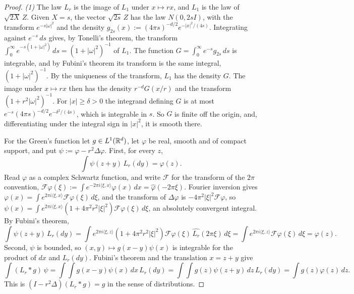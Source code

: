 \begin{proof}
\emph{(1)} The law $L_r$ is the image of $L_1$ under $x \mapsto rx$, and $L_1$ is the law of
$\sqrt{2X}\,Z$. Given $X = s$, the vector $\sqrt{2s}\,Z$ has the law $N(0, 2sI)$, with the transform
$e^{-s|\omega|^2}$ and the density $g_{2s}(x) := (4\pi s)^{-d/2}e^{-|x|^2/(4s)}$. Integrating against
$e^{-s}\,ds$ gives, by Tonelli's theorem, the transform
$\int_0^\infty e^{-s(1 + |\omega|^2)}\,ds = (1 + |\omega|^2)^{-1}$ of $L_1$. The function
$G = \int_0^\infty e^{-s}g_{2s}\,ds$ is integrable, and by Fubini's theorem its transform is the same
integral, $(1 + |\omega|^2)^{-1}$. By the uniqueness of the transform, $L_1$ has the density $G$.
The image under $x \mapsto rx$ then has the density $r^{-d}G(x/r)$ and the transform
$(1 + r^2|\omega|^2)^{-1}$. For $|x| \ge \delta > 0$ the integrand defining $G$ is at most
$e^{-s}(4\pi s)^{-d/2}e^{-\delta^2/(4s)}$, which is integrable in $s$. So $G$ is finite off the
origin, and, differentiating under the integral sign in $|x|^2$, it is smooth there.

For the Green's function let $g \in L^1(\mathbb{R}^d)$, let $\varphi$ be real, smooth and of compact
support, and put $\psi := \varphi - r^2\Delta\varphi$. First, for every $z$,
\[
  \int\psi(z + y)\,L_r(dy) = \varphi(z) .
\]
Read $\varphi$ as a complex Schwartz function, and write $\mathcal{F}$ for the transform of the
$2\pi$ convention, $\mathcal{F}\varphi(\xi) := \int e^{-2\pi i\langle\xi, x\rangle}\varphi(x)\,dx =
\widehat\varphi(-2\pi\xi)$. Fourier inversion gives
$\varphi(x) = \int e^{2\pi i\langle\xi, x\rangle}\mathcal{F}\varphi(\xi)\,d\xi$, and the transform of
$\Delta\varphi$ is $-4\pi^2|\xi|^2\mathcal{F}\varphi$, so
$\psi(x) = \int e^{2\pi i\langle\xi, x\rangle}(1 + 4\pi^2r^2|\xi|^2)\mathcal{F}\varphi(\xi)\,d\xi$, an
absolutely convergent integral. By Fubini's theorem,
\[
  \int\psi(z + y)\,L_r(dy)
   = \int e^{2\pi i\langle\xi, z\rangle}(1 + 4\pi^2r^2|\xi|^2)\mathcal{F}\varphi(\xi)\,
     \widehat{L_r}(2\pi\xi)\,d\xi
   = \int e^{2\pi i\langle\xi, z\rangle}\mathcal{F}\varphi(\xi)\,d\xi = \varphi(z) .
\]
Second, $\psi$ is bounded, so $(x, y) \mapsto g(x - y)\psi(x)$ is integrable for
the product of $dx$ and $L_r(dy)$. Fubini's theorem and the translation $x = z + y$ give
\[
  \int(L_r * g)\,\psi = \int\int g(x - y)\psi(x)\,dx\,L_r(dy)
   = \int\int g(z)\psi(z + y)\,dz\,L_r(dy) = \int g(z)\varphi(z)\,dz .
\]
This is $(I - r^2\Delta)(L_r * g) = g$ in the sense of distributions.


\end{proof}

